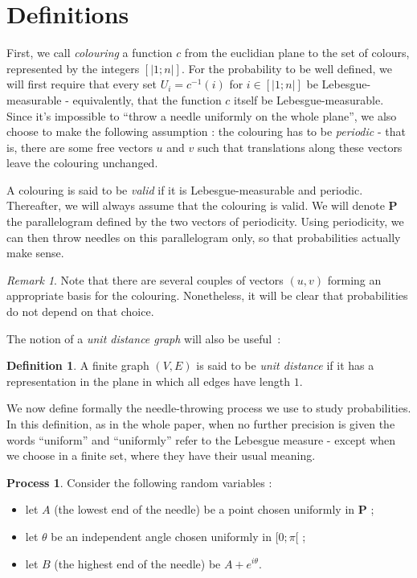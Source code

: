 \documentclass[a4paper,11pt]{article}
\theoremstyle{definition}
\newtheorem{definition}{Definition}
\newtheorem{process}{Process}
\theoremstyle{remark}
\newtheorem{remark}{Remark}
\begin{document}
\section{Definitions}
\label{def}
First, we call \emph{colouring} a function $c$ from the euclidian plane to the 
set of colours, represented by the integers $ [| 1 ; n |]$. For the probability 
to be well defined, we will 
first require that every set $U_i = c^{-1}(i)$ for $i \in [| 1 ; n |]$ be 
Lebesgue-measurable - equivalently, that the function $c$ itself be 
Lebesgue-measurable. Since it's impossible to ``throw a needle uniformly on the 
whole plane'', we also choose to make the following assumption : 
the colouring has to be \textit{periodic} - that is, there are some free vectors 
$u$ and $v$ such that translations along these vectors leave the colouring 
unchanged.

A colouring is said to be \emph{valid} if it is Lebesgue-measurable and 
periodic. Thereafter, we 
will always assume that the colouring is valid. We will denote $\mathbf{P}$ the 
parallelogram defined by the two vectors of periodicity. Using periodicity, 
we can then throw needles on this parallelogram only, so 
that probabilities actually make sense.
\begin{remark}
Note that there are several couples of vectors $(u, v)$ forming an appropriate 
basis for the colouring. Nonetheless, it will be clear that probabilities do not 
depend on that choice. 
\end{remark}

The notion of a \emph{unit distance graph} will also be useful~:
\begin{definition}

A finite graph $(V, E) $ is said to be \emph{unit distance} if it has a 
representation in the plane in which all edges have length $1$.
\end{definition}

We now define formally the needle-throwing process we use to study probabilities. 
In this definition, as in the whole paper, when no further precision 
is given the words ``uniform'' and ``uniformly'' refer to the Lebesgue measure -
except when we choose in a finite set, where they have their usual meaning.
\begin{process} \label{premier}
Consider the following random variables :
\begin{itemize}
  \item let $A$ (the lowest end of the needle) be a point chosen uniformly 
  in $\mathbf{P}$ ;
  \item let $\theta$ be an independent angle chosen uniformly in $[0;\pi[$ ;
  \item let $B$ (the highest end of the needle) be $A + e^{i \theta}$.
\end{itemize}
\end{process}
\end{document}
